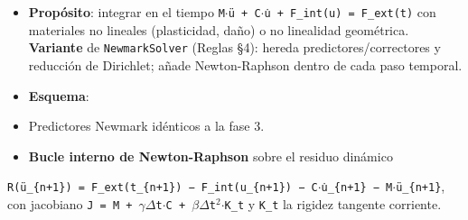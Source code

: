 \documentclass[11pt,letterpaper,oneside]{report}
\begin{document}
\begin{itemize}
  \item \textbf{Propósito}: integrar en el tiempo \texttt{M\ensuremath{\cdot}ü + C\ensuremath{\cdot}u̇ + F\_int(u) = F\_ext(t)} con materiales no lineales (plasticidad, daño) o no linealidad geométrica. \textbf{Variante} de \texttt{NewmarkSolver} (Reglas §4): hereda predictores/correctores y reducción de Dirichlet; añade Newton-Raphson dentro de cada paso temporal.
  \item \textbf{Esquema}:
  \item Predictores Newmark idénticos a la fase 3.
  \item \textbf{Bucle interno de Newton-Raphson} sobre el residuo dinámico
\end{itemize}
    \texttt{R(ü\_\{n+1\}) = F\_ext(t\_\{n+1\}) − F\_int(u\_\{n+1\}) − C\ensuremath{\cdot}u̇\_\{n+1\} − M\ensuremath{\cdot}ü\_\{n+1\}},
    con jacobiano \texttt{J = M + \ensuremath{\gamma}\ensuremath{\Delta}t\ensuremath{\cdot}C + \ensuremath{\beta}\ensuremath{\Delta}t\ensuremath{^{2}}\ensuremath{\cdot}K\_t} y \texttt{K\_t} la rigidez tangente corriente.
\end{document}
